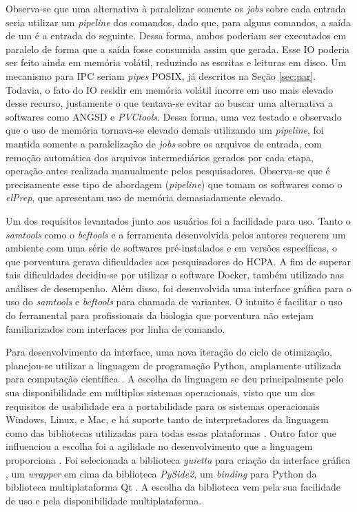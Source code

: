 \documentclass[cic,tc]{iiufrgs}
\begin{document}
Observa-se que uma alternativa à paralelizar somente os \textit{jobs} sobre cada
entrada seria utilizar um \textit{pipeline} dos comandos, dado que, para alguns
comandos, a saída de um é a entrada do seguinte. Dessa forma, ambos poderiam
ser executados em paralelo de forma que a saída fosse consumida assim que
gerada. Esse IO poderia ser feito ainda em memória volátil, reduzindo as
escritas e leituras em disco. Um mecanismo para IPC seriam \textit{pipes} POSIX, já
descritos na Seção \ref{sec:par}. Todavia, o fato do IO residir em memória
volátil incorre em uso mais elevado desse recurso, justamente o que tentava-se
evitar ao buscar uma alternativa a softwares como ANGSD e \textit{PVCtools}.
Dessa forma, uma vez testado e observado que o uso de memória tornava-se
elevado demais utilizando um \textit{pipeline}, foi mantida somente a
paralelização de \textit{jobs} sobre os arquivos de entrada, com remoção
automática dos arquivos intermediários gerados por cada etapa, operação antes
realizada manualmente pelos pesquisadores. Observa-se que é precisamente esse
tipo de abordagem (\textit{pipeline}) que tomam os softwares como o
\textit{elPrep}, que apresentam uso de memória demasiadamente elevado.

Um dos requisitos levantados junto aos usuários foi a facilidade para uso.
Tanto o \textit{samtools} como o \textit{bcftools} e a ferramenta desenvolvida
pelos autores requerem um ambiente com uma série de softwares pré-instalados e
em versões específicas, o que porventura gerava dificuldades aos pesquisadores
do HCPA. A fim de superar tais dificuldades decidiu-se por utilizar o software
Docker, também utilizado nas análises de desempenho. Além disso, foi
desenvolvida uma interface gráfica para o uso do \textit{samtools} e
\textit{bcftools} para chamada de variantes. O intuito é facilitar o uso do
ferramental para profissionais da biologia que porventura não estejam
familiarizados com interfaces por linha de comando.

Para desenvolvimento da interface, uma nova iteração do ciclo de otimização,
planejou-se utilizar a linguagem de programação Python, amplamente utilizada
para computação científica \cite{oliphant2007python}. A escolha da linguagem se
deu principalmente pelo sua disponibilidade em múltiplos sistemas operacionais,
visto que um dos requisitos de usabilidade era a portabilidade para os sistemas
operacionais Windows, Linux, e Mac, e há suporte tanto de interpretadores da
linguagem como das bibliotecas utilizadas para todas essas plataformas
\cite{oliphant2007python}. Outro fator que influenciou a escolha foi a
agilidade no desenvolvimento que a linguagem proporciona
\cite{oliphant2007python}. Foi selecionada a biblioteca \textit{guietta} para
criação da interface gráfica \cite{guietta}, um \textit{wrapper} em cima da
biblioteca \textit{PySide2}, um \textit{binding} para Python da biblioteca
multiplataforma Qt \cite{loganathan2013pyside}. A escolha da biblioteca vem
pela sua facilidade de uso e pela disponibilidade multiplataforma. 
\end{document}

